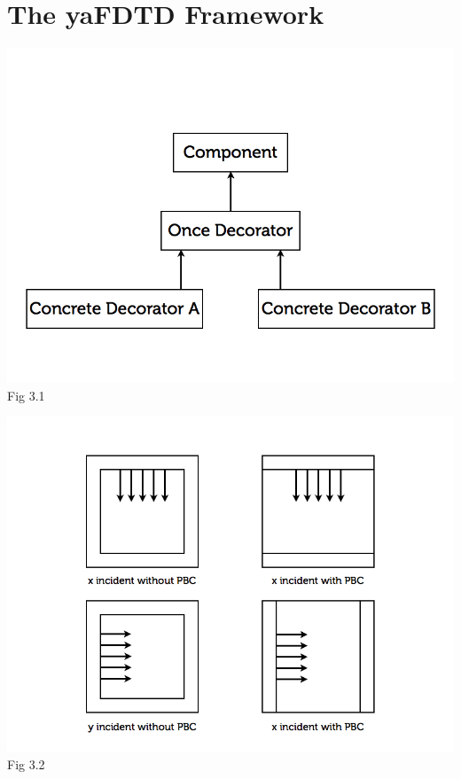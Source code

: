 \documentclass[openany]{book}
\begin{document}
\chapter{The yaFDTD Framework}








\clearpage
\begin{center}
\includegraphics[scale=0.5]{images/once-decorator.jpg}\\
Fig 3.1
\end{center}
\begin{center}
\includegraphics[scale=0.5]{images/tfsf-pbc.jpg}\\
Fig 3.2
\end{center}
\end{document}
